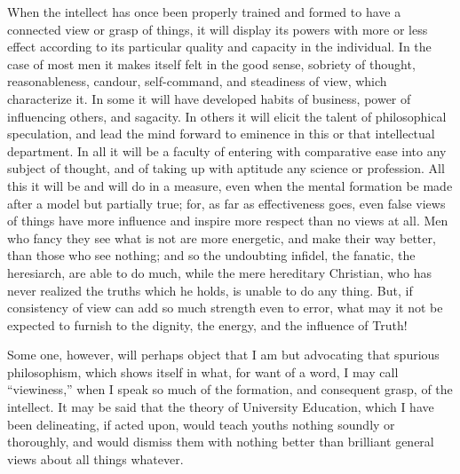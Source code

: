 When the intellect has once been properly trained and formed to have
a connected view or grasp of things, it will display its powers with
more or less effect according to its particular quality and
capacity in the individual. In the case of most men it makes itself felt
in the good sense, sobriety of thought, reasonableness, candour,
self-command, and steadiness of view, which characterize it. In some it
will have developed habits of business, power of influencing others, and
sagacity. In others it will elicit the talent of philosophical
speculation, and lead the mind forward to eminence in this or that
intellectual department. In all it will be a faculty of entering with
comparative ease into any subject of thought, and of taking up with
aptitude any science or profession. All this it will be and will do in a
measure, even when the mental formation be made after a model but
partially true; for, as far as effectiveness goes, even false views of
things have more influence and inspire more respect than no views at
all. Men who fancy they see what is not are more energetic, and make
their way better, than those who see nothing; and so the undoubting
infidel, the fanatic, the heresiarch, are able to do much, while the
mere hereditary Christian, who has never realized the truths which he
holds, is unable to do any thing. But, if consistency of view can add so
much strength even to error, what may it not be expected to furnish to
the dignity, the energy, and the influence of Truth!

Some one, however, will perhaps object that I am but advocating that
spurious philosophism, which shows itself in what, for want of a word, I
may call ``viewiness,'' when I speak so much of the formation,
and consequent grasp, of the intellect. It may be said that the theory
of University Education, which I have been delineating, if acted upon,
would teach youths nothing soundly or thoroughly, and would dismiss them
with nothing better than brilliant general views about all things
whatever.

